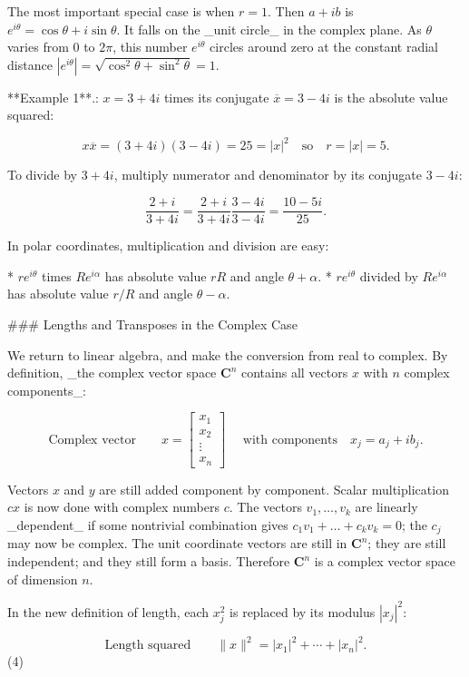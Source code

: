 The most important special case is when \(r=1\). Then \(a+ib\) is \(e^{i\theta}=\cos\theta+i\sin\theta\). It falls on the _unit circle_ in the complex plane. As \(\theta\) varies from \(0\) to \(2\pi\), this number \(e^{i\theta}\) circles around zero at the constant radial distance \(|e^{i\theta}|=\sqrt{\cos^{2}\theta+\sin^{2}\theta}=1\).

**Example 1**.: \(x=3+4i\) times its conjugate \(\overline{x}=3-4i\) is the absolute value squared:

\[x\overline{x}=(3+4i)(3-4i)=25=|x|^{2}\quad\text{so}\quad r=|x|=5.\]

To divide by \(3+4i\), multiply numerator and denominator by its conjugate \(3-4i\):

\[\frac{2+i}{3+4i}=\frac{2+i}{3+4i}\frac{3-4i}{3-4i}=\frac{10-5i}{25}.\]

In polar coordinates, multiplication and division are easy:

* \(re^{i\theta}\) times \(Re^{i\alpha}\) has absolute value \(rR\) and angle \(\theta+\alpha\).
* \(re^{i\theta}\) divided by \(Re^{i\alpha}\) has absolute value \(r/R\) and angle \(\theta-\alpha\).

### Lengths and Transposes in the Complex Case

We return to linear algebra, and make the conversion from real to complex. By definition, _the complex vector space \(\mathbf{C}^{n}\) contains all vectors \(x\) with \(n\) complex components_:

\[\text{Complex vector}\qquad x=\begin{bmatrix}x_{1}\\ x_{2}\\ \vdots\\ x_{n}\end{bmatrix}\quad\text{ with components}\quad x_{j}=a_{j}+ib_{j}.\]

Vectors \(x\) and \(y\) are still added component by component. Scalar multiplication \(cx\) is now done with complex numbers \(c\). The vectors \(v_{1},\ldots,v_{k}\) are linearly _dependent_ if some nontrivial combination gives \(c_{1}v_{1}+\ldots+c_{k}v_{k}=0\); the \(c_{j}\) may now be complex. The unit coordinate vectors are still in \(\mathbf{C}^{n}\); they are still independent; and they still form a basis. Therefore \(\mathbf{C}^{n}\) is a complex vector space of dimension \(n\).

In the new definition of length, each \(x_{j}^{2}\) is replaced by its modulus \(|x_{j}|^{2}\):

\[\text{Length squared}\qquad\|x\|^{2}=|x_{1}|^{2}+\cdots+|x_{n}|^{2}.\] (4)

